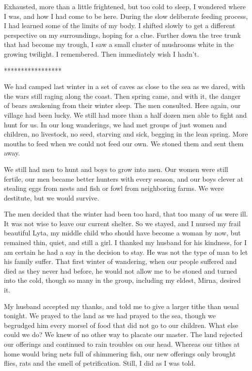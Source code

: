 Exhausted, more than a little frightened, but too cold to sleep, I wondered where I was, and how I had come to be here. During the slow deliberate feeding process, I had learned some of the limits of my body. I shifted slowly to get a different perspective on my surroundings, hoping for a clue. Further down the tree trunk that had become my trough, I saw a small cluster of mushrooms white in the growing twilight. I remembered. Then immediately wish I hadn't.

*****************

We had camped last winter in a set of caves as close to the sea as we dared, with the wars still raging along the coast. Then spring came, and with it, the danger of bears awakening from their winter sleep. The men consulted. Here again, our village had been lucky. We still had more than a half dozen men able to fight and hunt for us. In our long wanderings, we had met groups of just women and children, no livestock, no seed, starving and sick, begging in the lean spring. More mouths to feed when we could not feed our own. We stoned them and sent them away.

We still had men to hunt and boys to grow into men. Our women were still fertile, our men became better hunters with every season, and our boys clever at stealing eggs from nests and fish or fowl from neighboring farms. We were destitute, but we would survive.

The men decided that the winter had been too hard, that too many of us were ill. It was not wise to leave our current shelter. So we stayed, and I nursed my frail beautiful Lyta, my middle child who should have become a woman by now, but remained thin, quiet, and still a girl. I thanked my husband for his kindness, for I am certain he had a say in the decision to stay. He was not the type of man to let his family suffer. That first winter of wandering, when our people suffered and died as they never had before, he would not allow me to be stoned and turned into the cold, though so many in the group, including my eldest, Mirna, desired it.

My husband accepted my thanks, and told me to give a larger tithe than usual tonight. We prayed to the land as we had prayed to the sea, though we begrudged him every morsel of food that did not go to our children. What else could we do? We knew of no other way to placate our master. The land rejected our offerings and continued to rain troubles on our head. Whereas our tithes at home would bring nets full of shimmering fish, our new offerings only brought flies, rats and the smell of petrification. Still, I did as I was told.

